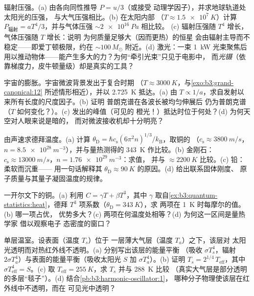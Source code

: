 \begin{exercise}[$\star\star$]\label{exo:b3:photons-phonons:5}
辐射压强。(a) 由各向同性推导 $P = u/3$（或接受
动理学因子），并求地球轨道处太阳光的压强，
与大气压强相比。(b) 在太阳内部
（$T \approx \qty{1.5e7}{K}$）计算 $P_{\text{辐射}} =
aT^4/3$，并与气体压强 $\sim\qty{2e16}{Pa}$ 相比较。
(c) 辐射压强随 $T^4$ 增长，气体压强随 $T$ 增长：说明
为何质量足够大（因而更热）的恒星
会由辐射主导而不稳定——即爱丁顿极限，约在
$\sim100\,M_\odot$ 附近。(d) 激光：一束 \qty{1}{kW} 光束聚焦后
用以推动物体——能产生多大的力？为何“牵引光束”只见于电影中，
而\emph{光镊}（依靠梯度力，皮牛顿量级）却是真实的工具？
\end{exercise}

\begin{exercise}[$\star\star$]\label{exo:b3:photons-phonons:6}
宇宙的膨胀。宇宙微波背景发出于复合时期
（$T \approx \qty{3000}{K}$，与\cref{exo:b3:grand-canonical:12}
所述情形相近），并以 \qty{2.725}{K} 抵达。(a) 由 $T \propto
1/a$，求自发射以来所有长度的尺度因子。(b) 证明
普朗克谱在各波长被均匀伸展后
仍为普朗克谱（$T$ 如何变化？）。(c) 发出的峰值（可见的
橙光！）抵达时位于何处？(d) 为何天空对人眼来说是暗的，
而对微波接收机却十分明亮？
\end{exercise}

\begin{exercise}[$\star\star$]\label{exo:b3:photons-phonons:7}
由声速求德拜温度。(a) 计算 $\theta_{\text{D}} =
\hbar c_{\text{s}}(6\pi^2n)^{1/3}/k_{\text{B}}$，取铜的
（$c_{\text{s}} \approx \qty{3800}{m/s}$，$n =
\qty{8.5e28}{m^{-3}}$），并与量热测得的
\qty{343}{K} 作比较。(b) 金刚石：$c_{\text{s}} \approx
\qty{13000}{m/s}$，$n = \qty{1.76e29}{m^{-3}}$：求值，
并与 $\approx\qty{2200}{K}$ 比较。(c) 铅：柔软而沉重——
用一句话解释其 $\theta_{\text{D}} \approx \qty{90}{K}$
的原因。(d) 给出联系固体刚度、
原子质量与其量子凝固温度的规律。
\end{exercise}

\begin{exercise}[$\star\star$]\label{exo:b3:photons-phonons:8}
一开尔文下的铜。(a) 利用 $C = \gamma T + \beta T^3$，其中
$\gamma$ 取自\cref{ex:b3:quantum-statistics:heat}，德拜
$T^3$ 项系数（$\theta_{\text{D}} = \qty{343}{K}$），求
两项在 \qty{1}{K} 时每摩尔的值。(b) 哪一项占优，
优势多大？(c) 两项在何温度处相等？(d) 为何这一区间是量热学家
借以观察电子
态密度的窗口？
\end{exercise}

\begin{exercise}[$\star\star$]\label{exo:b3:photons-phonons:9}
单层温室。设表面（温度 $T_s$）位于
一层薄大气层（温度 $T_a$）之下，该层对
太阳光透明而对热红外线不透明。(a) 分别写出该层的能量平衡
（吸收 $\sigma T_s^4$，辐射
$2\sigma T_a^4$）与表面的能量平衡（吸收太阳光 $S$ 加
$\sigma T_a^4$）。(b) 证明 $T_s = 2^{1/4}\,T_{\text{eff}}$，其中
$\sigma T_{\text{eff}}^4 = S$。(c) 取 $T_{\text{eff}} =
\qty{255}{K}$，求 $T_s$ 并与 \qty{288}{K} 比较
（真实大气层是部分透明的多层“毯子”）。(d)
结合\cref{pb:b3:harmonic-oscillator:1}，
哪种分子物理使该层在红外线中不透明，而在
可见光中透明？
\end{exercise}

